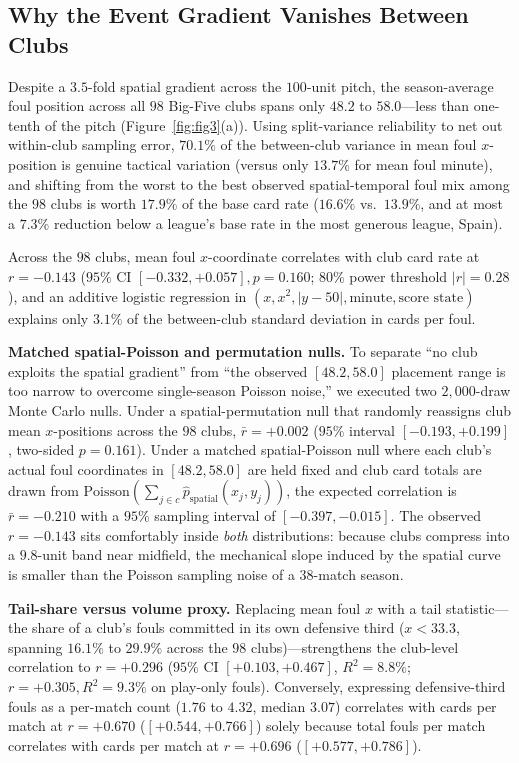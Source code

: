 \documentclass[10pt,twocolumn]{article}
\begin{document}
\subsection{Why the Event Gradient Vanishes Between Clubs}
Despite a $3.5$-fold spatial gradient across the $100$-unit pitch, the season-average foul position across all $98$ Big-Five clubs spans only $\mathbf{48.2}$ to $\mathbf{58.0}$---less than one-tenth of the pitch (Figure~\ref{fig:fig3}(a)). Using \citet{cronbach1951alpha} split-variance reliability to net out within-club sampling error, $70.1\%$ of the between-club variance in mean foul $x$-position is genuine tactical variation (versus only $13.7\%$ for mean foul minute), and shifting from the worst to the best observed spatial-temporal foul mix among the $98$ clubs is worth $17.9\%$ of the base card rate ($16.6\%$ vs.\ $13.9\%$, and at most a $7.3\%$ reduction below a league's base rate in the most generous league, Spain).

Across the $98$ clubs, mean foul $x$-coordinate correlates with club card rate at $r = -0.143$ ($95\%$ CI $[-0.332, +0.057], p = 0.160$; $80\%$ power threshold $|r| = 0.28$), and an additive logistic regression in $(x, x^2, |y-50|, \text{minute}, \text{score state})$ explains only $\mathbf{3.1\%}$ of the between-club standard deviation in cards per foul.

\textbf{Matched spatial-Poisson and permutation nulls.} To separate ``no club exploits the spatial gradient'' from ``the observed $[48.2, 58.0]$ placement range is too narrow to overcome single-season Poisson noise,'' we executed two $2,000$-draw Monte Carlo nulls. Under a spatial-permutation null that randomly reassigns club mean $x$-positions across the $98$ clubs, $\bar{r} = +0.002$ ($95\%$ interval $[-0.193, +0.199]$, two-sided $p = 0.161$). Under a matched spatial-Poisson null where each club's actual foul coordinates in $[48.2, 58.0]$ are held fixed and club card totals are drawn from $\text{Poisson}(\sum_{j \in c} \hat{p}_{\text{spatial}}(x_j, y_j))$, the expected correlation is $\bar{r} = \mathbf{-0.210}$ with a $95\%$ sampling interval of $\mathbf{[-0.397, -0.015]}$. The observed $r = -0.143$ sits comfortably inside \emph{both} distributions: because clubs compress into a $9.8$-unit band near midfield, the mechanical slope induced by the spatial curve is smaller than the Poisson sampling noise of a $38$-match season.

\textbf{Tail-share versus volume proxy.} Replacing mean foul $x$ with a tail statistic---the share of a club's fouls committed in its own defensive third ($x < 33.3$, spanning $16.1\%$ to $29.9\%$ across the $98$ clubs)---strengthens the club-level correlation to $r = \mathbf{+0.296}$ ($95\%$ CI $[+0.103, +0.467]$, $R^2 = \mathbf{8.8\%}$; $r = +0.305, R^2 = 9.3\%$ on play-only fouls). Conversely, expressing defensive-third fouls as a per-match count ($1.76$ to $4.32$, median $3.07$) correlates with cards per match at $r = +0.670$ ($[+0.544, +0.766]$) solely because total fouls per match correlates with cards per match at $r = +0.696$ ($[+0.577, +0.786]$).
\end{document}
